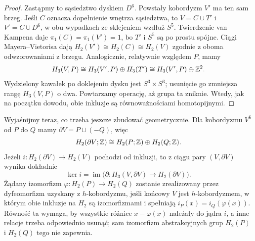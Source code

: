 \begin{proof}
Zastąpmy to sąsiedztwo dyskiem $D^6$.
Powstały kobordyzm $V'$ ma ten sam
brzeg. Jeśli $C$ oznacza dopełnienie
wnętrza sąsiedztwa, to $V=C\cup T'$
i $V'=C\cup D^6$, w obu wypadkach
ze sklejeniem wzdłuż $S^5$.
Twierdzenie van Kampena daje
$\pi_1(C)=\pi_1(V')=1$, bo
$T'$ i $S^5$ są po prostu spójne.
Ciągi Mayera--Vietorisa dają
$H_2(V')\cong H_2(C)\cong H_2(V)$
zgodnie z oboma odwzorowaniami
z brzegu. Analogicznie, relatywnie
względem $P$, mamy
\[
 H_3(V,P)\cong H_3(V',P)\oplus
 H_3(T')\cong H_3(V',P)\oplus\mathbb{Z}^2.
\]
Wydzielony kawałek po doklejeniu
dysku jest $S^3\times S^3$;
usunięcie go zmniejsza rangę
$H_3(V,P)$ o dwa. Powtarzamy operację,
aż grupa ta zniknie. Wtedy, jak
na początku dowodu, obie inkluzje
są równoważnościami homotopijnymi.
\end{proof}

Wyjaśnijmy teraz, co trzeba jeszcze
zbudować geometrycznie. Dla kobordyzmu
$V^6$ od $P$ do $Q$ mamy
$\partial V=P\sqcup(-Q)$, więc
\[
H_2(\partial V;\mathbb{Z})
 \cong H_2(P;\mathbb{Z})\oplus H_2(Q;\mathbb{Z}).
\]
Jeżeli $i\colon H_2(\partial V)\to H_2(V)$
pochodzi od inkluzji, to z ciągu pary
$(V,\partial V)$ wynika dokładnie
\[
\ker i=\operatorname{im}\bigl(
\partial\colon H_3(V,\partial V)
\longrightarrow H_2(\partial V)\bigr).
\]
Żądany izomorfizm
$\varphi\colon H_2(P)\to H_2(Q)$
zostanie zrealizowany przez dyfeomorfizm
uzyskany z $h$-kobordyzmu, jeśli końcowy
$V$ jest $h$-kobordyzmem, w którym
obie inkluzje na $H_2$ są izomorfizmami
i spełniają $i_P(x)=i_Q(\varphi(x))$.
Równość ta wymaga, by wszystkie różnice
$x-\varphi(x)$ należały do jądra $i$,
a inne relacje trzeba odpowiednio usunąć;
sam izomorfizm abstrakcyjnych grup
$H_2(P)$ i $H_2(Q)$ tego nie zapewnia.

